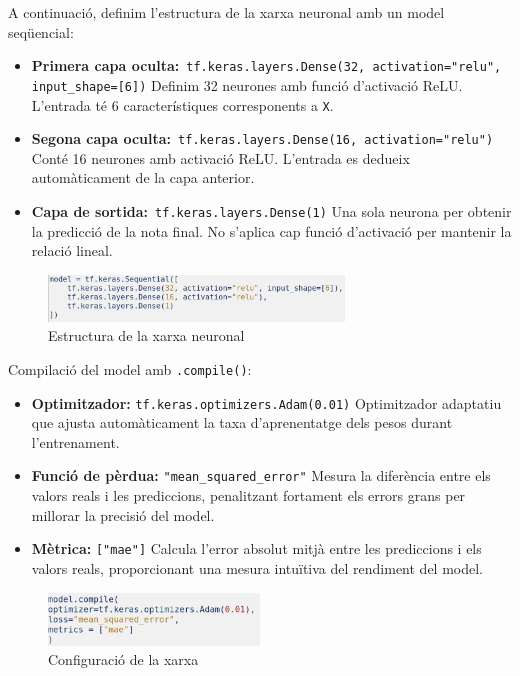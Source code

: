 A continuació, definim l’estructura de la xarxa neuronal amb un model seqüencial:
\begin{itemize}
\item \textbf{Primera capa oculta:}\
\texttt{tf.keras.layers.Dense(32, activation="relu", input\_shape=[6])}
Definim 32 neurones amb funció d’activació ReLU. L’entrada té 6 característiques corresponents a \texttt{X}.

\item \textbf{Segona capa oculta:}\
\texttt{tf.keras.layers.Dense(16, activation="relu")}
Conté 16 neurones amb activació ReLU. L’entrada es dedueix automàticament de la capa anterior.

\item \textbf{Capa de sortida:}\
\texttt{tf.keras.layers.Dense(1)}
Una sola neurona per obtenir la predicció de la nota final. No s’aplica cap funció d’activació per mantenir la relació lineal.
\end{itemize}

\begin{figure}[h!]
\centering
\includegraphics[width=0.7\textwidth]{./figures/26.png}
\caption{Estructura de la xarxa neuronal}
\end{figure}

Compilació del model amb \texttt{.compile()}:

\begin{itemize}
\item \textbf{Optimitzador:} \texttt{tf.keras.optimizers.Adam(0.01)}
Optimitzador adaptatiu que ajusta automàticament la taxa d’aprenentatge dels pesos durant l’entrenament.

\item \textbf{Funció de pèrdua:} \texttt{"mean\_squared\_error"}
Mesura la diferència entre els valors reals i les prediccions, penalitzant fortament els errors grans per millorar la precisió del model.

\item \textbf{Mètrica:} \texttt{["mae"]}
Calcula l’error absolut mitjà entre les prediccions i els valors reals, proporcionant una mesura intuïtiva del rendiment del model.
\end{itemize}

\begin{figure}[H]
\centering
\includegraphics[width=0.5\textwidth]{./figures/27.png}
\caption{Configuració de la xarxa}
\end{figure}

